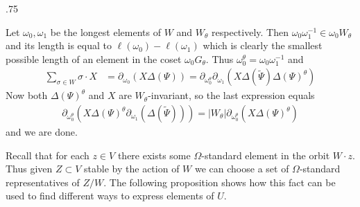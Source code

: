 \documentclass[11pt,fleqn]{amsart}
\makeatletter
\renewcommand\proofname{Proof}
\renewenvironment{proof}[1][\textit{\proofname}]{\par
 \pushQED{\qed}%
 \normalfont \topsep.75\paraskip\relax
 \trivlist
 \item[\hskip\labelsep
 \itshape
 #1\@addpunct{.}]\ignorespaces
}{%
 \popQED\endtrivlist\@endpefalse
}
\newcounter{para}[section]
\makeatother
\begin{document}
\begin{proof}
Let $\omega_0, \omega_1$ be the longest elements of $W$ and $W_\theta$ 
respectively. Then $\omega_0 \omega_1^{-1} \in \omega_0 W_\theta$ and its 
length is equal to $\ell(\omega_0) - \ell(\omega_1)$ which is clearly the 
smallest possible length of an element in the coset $\omega_0 G_\theta$. Thus 
$\omega_0^\theta = \omega_0 \omega_1^{-1}$ and
\begin{align*}
\sum_{\sigma \in W} \sigma \cdot X 
	&=\partial_{\omega_0}(X \Delta(\Psi))
	= \partial_{\omega^\theta_0} \partial_{\omega_1}(X \Delta(\widetilde \Psi) 
	\Delta(\Psi)^\theta)
\end{align*}
Now both $\Delta(\Psi)^\theta$ and $X$ are $W_\theta$-invariant, so the last 
expression equals
\begin{align*}
\partial_{\omega^\theta_0}(
	X \Delta(\Psi)^\theta \partial_{\omega_1}(
		\Delta(\widetilde \Psi)))
	= |W_\theta| \partial_{\omega^\theta_0}(X \Delta(\Psi)^\theta)
\end{align*}
and we are done.
\end{proof}

Recall that for each $z \in V$ there exists some $\Omega$-standard element in 
the orbit $W \cdot z$. Thus given $Z \subset V$ stable by the action of $W$ we 
can choose a set of $\Omega$-standard representatives of $Z/W$. The following
proposition shows how this fact can be used to find different ways to express
elements of $U$.
\end{document}
